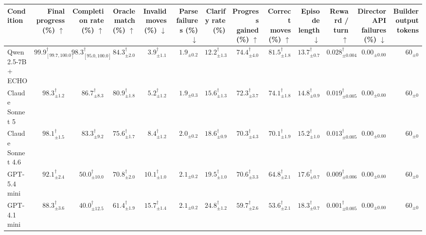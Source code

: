 \begin{table}[t]
\centering
\small
\begin{tabular}{lrrrrrrrrrrrr}
\toprule
Condition & Final progress (\%) $\uparrow$ & Completion rate (\%) $\uparrow$ & Oracle match (\%) $\uparrow$ & Invalid moves (\%) $\downarrow$ & Parse failures (\%) $\downarrow$ & Clarify rate (\%) & Progress gained (\%) $\uparrow$ & Correct moves (\%) $\uparrow$ & Episode length $\downarrow$ & Reward / turn $\uparrow$ & Director API failures (\%) $\downarrow$ & Builder output tokens \\
\midrule
Qwen2.5-7B + ECHO & $\mathbf{99.9}_{[99.7, 100.0]}^{\dagger}$ & $\mathbf{98.3}_{[95.0, 100.0]}^{\dagger}$ & $\mathbf{84.3}_{\pm 2.0}^{\dagger}$ & $\mathbf{3.9}_{\pm 1.1}^{\dagger}$ & $1.9_{\pm 0.2}$ & $12.2_{\pm 1.3}^{\dagger}$ & $\mathbf{74.4}_{\pm 4.0}^{\dagger}$ & $\mathbf{81.5}_{\pm 1.8}^{\dagger}$ & $\mathbf{13.7}_{\pm 0.7}^{\dagger}$ & $\mathbf{0.028}_{\pm 0.004}^{\dagger}$ & $\mathbf{0.00}_{\pm 0.00}$ & $60_{\pm 0}$ \\
\midrule
Claude Sonnet 5 & $98.3_{\pm 1.2}^{\dagger}$ & $86.7_{\pm 8.3}^{\dagger}$ & $80.9_{\pm 1.8}^{\dagger}$ & $5.2_{\pm 1.2}^{\dagger}$ & $1.9_{\pm 0.3}$ & $15.6_{\pm 1.3}^{\dagger}$ & $72.3_{\pm 3.7}^{\dagger}$ & $74.1_{\pm 1.8}^{\dagger}$ & $14.8_{\pm 0.9}^{\dagger}$ & $0.019_{\pm 0.005}^{\dagger}$ & $\mathbf{0.00}_{\pm 0.00}$ & $60_{\pm 0}$ \\
Claude Sonnet 4.6 & $98.1_{\pm 1.5}^{\dagger}$ & $83.3_{\pm 9.2}^{\dagger}$ & $75.6_{\pm 1.7}^{\dagger}$ & $8.4_{\pm 1.2}^{\dagger}$ & $2.0_{\pm 0.2}$ & $18.6_{\pm 0.9}^{\dagger}$ & $70.3_{\pm 4.3}^{\dagger}$ & $70.1_{\pm 1.9}^{\dagger}$ & $15.2_{\pm 1.0}^{\dagger}$ & $0.013_{\pm 0.005}^{\dagger}$ & $\mathbf{0.00}_{\pm 0.00}$ & $60_{\pm 0}$ \\
GPT-5.4 mini & $92.1_{\pm 2.4}^{\dagger}$ & $50.0_{\pm 10.0}^{\dagger}$ & $70.8_{\pm 2.0}^{\dagger}$ & $10.1_{\pm 1.0}^{\dagger}$ & $2.1_{\pm 0.2}$ & $19.5_{\pm 1.0}^{\dagger}$ & $70.6_{\pm 3.3}^{\dagger}$ & $64.8_{\pm 2.1}^{\dagger}$ & $17.6_{\pm 0.7}^{\dagger}$ & $0.009_{\pm 0.006}^{\dagger}$ & $\mathbf{0.00}_{\pm 0.00}$ & $60_{\pm 0}$ \\
GPT-4.1 mini & $88.3_{\pm 3.6}^{\dagger}$ & $40.0_{\pm 12.5}^{\dagger}$ & $61.4_{\pm 1.9}^{\dagger}$ & $15.7_{\pm 1.4}^{\dagger}$ & $2.1_{\pm 0.2}$ & $24.8_{\pm 1.2}^{\dagger}$ & $59.7_{\pm 2.6}^{\dagger}$ & $53.6_{\pm 2.1}^{\dagger}$ & $18.3_{\pm 0.7}^{\dagger}$ & $0.001_{\pm 0.005}^{\dagger}$ & $\mathbf{0.00}_{\pm 0.00}$ & $60_{\pm 0}$ \\

\end{tabular}
\end{table}
